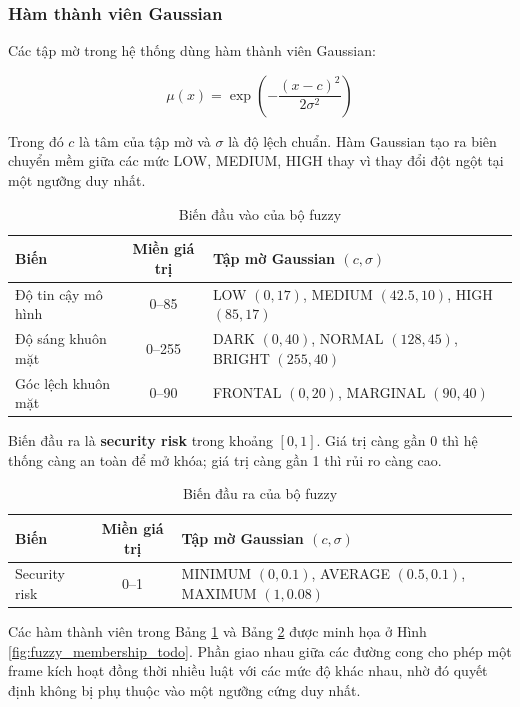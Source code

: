 \subsubsection{Hàm thành viên Gaussian}

Các tập mờ trong hệ thống dùng hàm thành viên Gaussian:

\begin{equation}
    \mu(x) = \exp\left(-\frac{(x-c)^2}{2\sigma^2}\right)
\end{equation}

Trong đó $c$ là tâm của tập mờ và $\sigma$ là độ lệch chuẩn. Hàm Gaussian tạo ra biên chuyển mềm giữa các mức LOW, MEDIUM, HIGH thay vì thay đổi đột ngột tại một ngưỡng duy nhất.

\begin{table}[H]
\centering
\caption{Biến đầu vào của bộ fuzzy}
\label{tab:fuzzy_inputs}
\begin{tabular}{|l|c|l|}
\hline
\textbf{Biến} & \textbf{Miền giá trị} & \textbf{Tập mờ Gaussian $(c,\sigma)$} \\
\hline
Độ tin cậy mô hình & 0--85 & LOW $(0,17)$, MEDIUM $(42.5,10)$, HIGH $(85,17)$ \\
\hline
Độ sáng khuôn mặt & 0--255 & DARK $(0,40)$, NORMAL $(128,45)$, BRIGHT $(255,40)$ \\
\hline
Góc lệch khuôn mặt & 0--90 & FRONTAL $(0,20)$, MARGINAL $(90,40)$ \\
\hline
\end{tabular}
\end{table}

Biến đầu ra là \textbf{security risk} trong khoảng $[0,1]$. Giá trị càng gần 0 thì hệ thống càng an toàn để mở khóa; giá trị càng gần 1 thì rủi ro càng cao.

\begin{table}[H]
\centering
\caption{Biến đầu ra của bộ fuzzy}
\label{tab:fuzzy_output}
\begin{tabular}{|l|c|l|}
\hline
\textbf{Biến} & \textbf{Miền giá trị} & \textbf{Tập mờ Gaussian $(c,\sigma)$} \\
\hline
Security risk & 0--1 & MINIMUM $(0,0.1)$, AVERAGE $(0.5,0.1)$, MAXIMUM $(1,0.08)$ \\
\hline
\end{tabular}
\end{table}

Các hàm thành viên trong Bảng \ref{tab:fuzzy_inputs} và Bảng \ref{tab:fuzzy_output} được minh họa ở Hình \ref{fig:fuzzy_membership_todo}. Phần giao nhau giữa các đường cong cho phép một frame kích hoạt đồng thời nhiều luật với các mức độ khác nhau, nhờ đó quyết định không bị phụ thuộc vào một ngưỡng cứng duy nhất.

